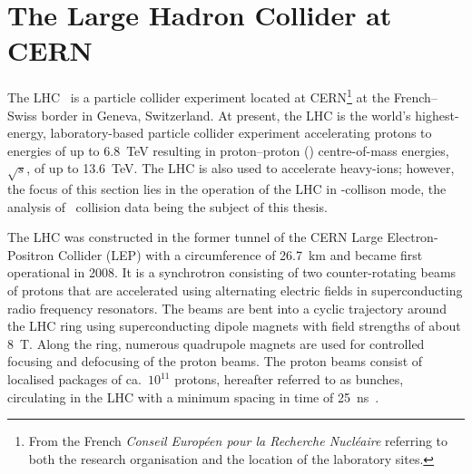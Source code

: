 \section{The Large Hadron Collider at CERN}%
\label{sec:lhc}

The LHC~\cite{Evans:2008zzb} is a particle collider experiment located at
CERN\footnote{From the French \emph{Conseil Européen pour la Recherche
    Nucléaire} referring to both the research organisation and the location of
  the laboratory sites.} at the French--Swiss border in Geneva, Switzerland.  At
present, the LHC is the world's highest-energy, laboratory-based particle
collider experiment accelerating protons to energies of up to \SI{6.8}{\TeV}
resulting in proton--proton (\pp) centre-of-mass energies, $\sqrt{s}$, of up to
\SI{13.6}{\TeV}. The LHC is also used to accelerate heavy-ions; however, the
focus of this section lies in the operation of the LHC in \pp-collison mode, the
analysis of \pp~collision data being the subject of this thesis.

The LHC was constructed in the former tunnel of the CERN Large Electron-Positron
Collider (LEP) with a circumference of \SI{26.7}{\kilo\metre} and became first
operational in 2008. It is a synchrotron consisting of two counter-rotating
beams of protons that are accelerated using alternating electric fields in
superconducting radio frequency resonators. The beams are bent into a cyclic
trajectory around the LHC ring using superconducting dipole magnets with field
strengths of about \SI{8}{\tesla}. Along the ring, numerous quadrupole magnets
are used for controlled focusing and defocusing of the proton beams.
The proton beams consist of localised packages of ca.\ $10^{11}$ protons,
hereafter referred to as bunches, circulating in the LHC with a minimum spacing
in time of \SI{25}{\nano\second}~\cite{Evans:2008zzb}.

